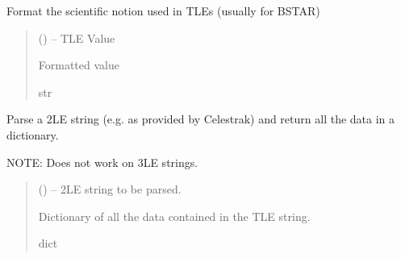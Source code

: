 \documentclass[letterpaper,10pt,english]{sphinxmanual}
\begin{document}

\begin{fulllineitems}
\label{\detokenize{fspsim.utils:fspsim.utils.Conversions.tle_exponent_format}}
\pysigstartsignatures
{}
\pysigstopsignatures
\sphinxAtStartPar
Format the scientific notion used in TLEs (usually for BSTAR)
\begin{quote}\begin{description}
\sphinxAtStartPar
{} () – TLE Value

\sphinxAtStartPar
Formatted value

\sphinxAtStartPar
str

\end{description}\end{quote}

\end{fulllineitems}


\begin{fulllineitems}
\label{\detokenize{fspsim.utils:fspsim.utils.Conversions.tle_parse}}
\pysigstartsignatures
{}
\pysigstopsignatures
\sphinxAtStartPar
Parse a 2LE string (e.g. as provided by Celestrak) and return all the data in a dictionary.

\sphinxAtStartPar
NOTE: Does not work on 3LE strings.
\begin{quote}\begin{description}
\sphinxAtStartPar
{} () – 2LE string to be parsed.

\sphinxAtStartPar
Dictionary of all the data contained in the TLE string.

\sphinxAtStartPar
dict

\end{description}\end{quote}

\end{fulllineitems}
\end{document}
